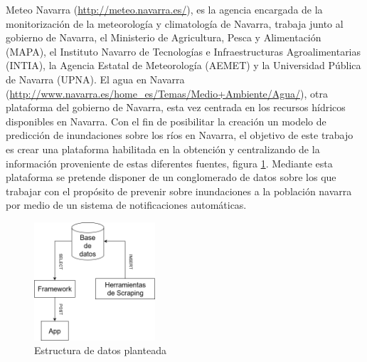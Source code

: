 \newline
Meteo Navarra (\url{http://meteo.navarra.es/}), es la agencia encargada de la  monitorización de la meteorología y climatología de Navarra, trabaja junto al gobierno de Navarra, el Ministerio de Agricultura, Pesca y Alimentación (MAPA), el Instituto Navarro de Tecnologías e Infraestructuras Agroalimentarias (INTIA), la Agencia Estatal de Meteorología (AEMET) y la Universidad Pública de Navarra (UPNA).\newline
\newline
El agua en Navarra (\url{http://www.navarra.es/home_es/Temas/Medio+Ambiente/Agua/}), otra plataforma del gobierno de Navarra, esta vez centrada en los recursos hídricos disponibles en Navarra.\newline
\newline
Con el fin de posibilitar la creación un modelo de predicción de inundaciones sobre los ríos en Navarra, el objetivo de este trabajo es crear una plataforma habilitada en la obtención y centralizando de la información proveniente de estas diferentes fuentes, figura \ref{fig:ej31}. Mediante esta plataforma se pretende disponer de un conglomerado de datos sobre los que trabajar con el propósito de prevenir sobre inundaciones a la población navarra por medio de un sistema de notificaciones automáticas.\newline
\newline

\begin{figure} [H]
	\centering
	\includegraphics[width=0.4\textwidth]{fig/estructura_general.png}
	\caption[Estructura de datos planteada]{Estructura de datos planteada}
	\label{fig:ej31}
\end{figure}

